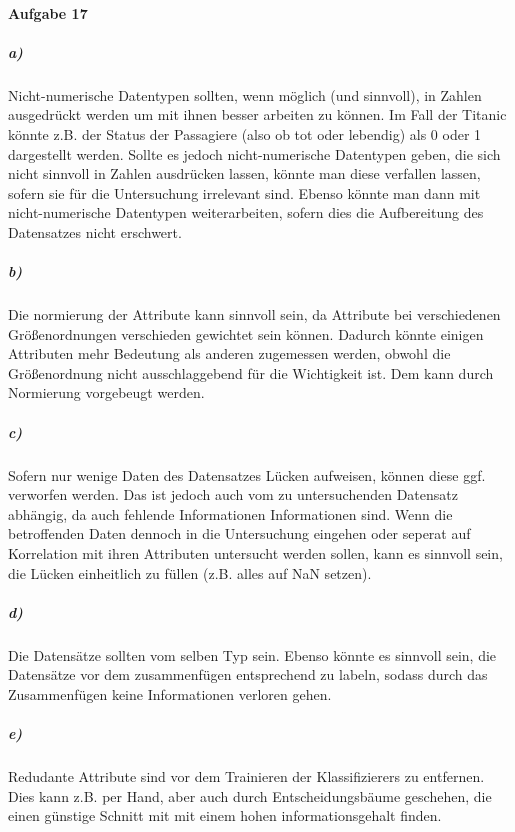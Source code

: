 \paragraph{Aufgabe 17}


\subparagraph{a)}
Nicht-numerische Datentypen sollten, wenn möglich (und sinnvoll), in Zahlen ausgedrückt werden um mit ihnen besser arbeiten zu können.
Im Fall der Titanic könnte z.B. der Status der Passagiere (also ob tot oder lebendig) als 0 oder 1 dargestellt werden.
Sollte es jedoch nicht-numerische Datentypen geben, die sich nicht sinnvoll in Zahlen ausdrücken lassen, könnte man diese verfallen lassen, sofern sie für die Untersuchung irrelevant sind.
Ebenso könnte man dann mit nicht-numerische Datentypen weiterarbeiten, sofern dies die Aufbereitung des Datensatzes nicht erschwert.

\subparagraph{b)}
Die normierung der Attribute kann sinnvoll sein, da Attribute bei verschiedenen Größenordnungen verschieden gewichtet sein können.
Dadurch könnte einigen Attributen mehr Bedeutung als anderen zugemessen werden, obwohl die Größenordnung nicht ausschlaggebend für die Wichtigkeit ist. Dem kann durch Normierung vorgebeugt werden.
\subparagraph{c)}
Sofern nur wenige Daten des Datensatzes Lücken aufweisen, können diese ggf. verworfen werden. Das ist jedoch auch vom zu untersuchenden Datensatz abhängig, da auch fehlende Informationen Informationen sind.
Wenn die betroffenden Daten dennoch in die Untersuchung eingehen oder seperat auf Korrelation mit ihren Attributen untersucht werden sollen, kann es sinnvoll sein, die Lücken einheitlich zu füllen (z.B. alles auf NaN setzen).

\subparagraph{d)}
Die Datensätze sollten vom selben Typ sein. Ebenso könnte es sinnvoll sein, die Datensätze vor dem zusammenfügen entsprechend zu labeln, sodass durch das Zusammenfügen keine Informationen verloren gehen.

\subparagraph{e)}
Redudante Attribute sind vor dem Trainieren der Klassifizierers zu entfernen. Dies kann z.B. per Hand, aber auch durch Entscheidungsbäume geschehen, die einen günstige Schnitt mit mit einem hohen informationsgehalt finden. 
